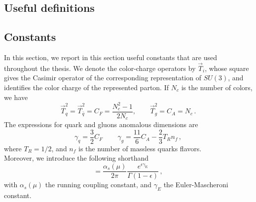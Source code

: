 \documentclass[a4paper, 12pt]{book}
\begin{document}
\begin{appendices}
\pagestyle{append}

\chapter{Useful definitions}

\section{Constants}
In this section, we report in this section useful constants that are used throughout the thesis. We denote the color-charge operators by $\vec{T}_i$, whose square gives the Casimir operator of the corresponding representation of $SU(3)$, and identifies the color charge of the represented parton. If $N_c$ is the number of colors, we have
\begin{equation}
  \vec{T}_q^2 = \vec{T}_{\bar{q}}^2 = C_F = \frac{N^2_c -1}{2N_c} , \qquad \vec{T}_g^2=C_A= N_c \, .
  \label{casimir-operators}
\end{equation}
The expressions for quark and gluons anomalous dimensions are 
\begin{equation}
  \gamma_q = \frac{3}{2}C_F \, \qquad \gamma_g = \frac{11}{6}C_A - \frac{2}{3}T_R n_f \, ,
  \label{anomalous-dimension}
\end{equation}
where $T_R=1/2$, and $n_f$ is the number of massless quarks flavors. \\
Moreover, we introduce the following shorthand
\begin{equation}
  [\alpha_s] = \frac{\alpha_s(\mu)}{2\pi} \frac{e^{\epsilon \gamma_{\mathrm{E}}}}{\Gamma(1-\epsilon)} \, ,
  \label{coupling}
\end{equation}
with $\alpha_s(\mu)$ the running coupling constant, and $\gamma_E$ the Euler-Mascheroni constant.


\end{appendices}
\end{document}
